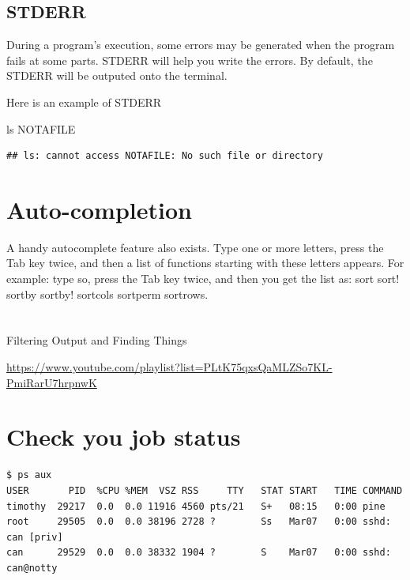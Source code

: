 \documentclass[]{book}
\makeatletter
\newenvironment{Shaded}{\begin{snugshade}}{\end{snugshade}}
\newcommand{\FunctionTok}[1]{\textcolor[rgb]{0.00,0.00,0.00}{#1}}
\newcommand{\NormalTok}[1]{#1}
\newenvironment{kframe}{%
\medskip{}
\setlength{\fboxsep}{.8em}
 \def\at@end@of@kframe{}%
 \ifinner\ifhmode%
  \def\at@end@of@kframe{\end{minipage}}%
  \begin{minipage}{\columnwidth}%
 \fi\fi%
 \def\FrameCommand##1{\hskip\@totalleftmargin \hskip-\fboxsep
 \colorbox{shadecolor}{##1}\hskip-\fboxsep
     \hskip-\linewidth \hskip-\@totalleftmargin \hskip\columnwidth}%
 \MakeFramed {\advance\hsize-\width
   \@totalleftmargin\z@ \linewidth\hsize
   \@setminipage}}%
 {\par\unskip\endMakeFramed%
 \at@end@of@kframe}
\renewenvironment{Shaded}{\begin{kframe}}{\end{kframe}}
\theoremstyle{definition}
\theoremstyle{definition}
\theoremstyle{definition}
\theoremstyle{remark}
\makeatother
\begin{document}
\subsection{STDERR}\label{stderr}

During a program's execution, some errors may be generated when the
program fails at some parts. STDERR will help you write the errors. By
default, the STDERR will be outputed onto the terminal.

Here is an example of STDERR

\begin{Shaded}
\begin{Highlighting}[]
\FunctionTok{ls}\NormalTok{ NOTAFILE}
\end{Highlighting}
\end{Shaded}

\begin{verbatim}
## ls: cannot access NOTAFILE: No such file or directory
\end{verbatim}

\section{Auto-completion}\label{auto-completion-1}

A handy autocomplete feature also exists. Type one or more letters,
press the Tab key twice, and then a list of functions starting with
these letters appears. For example: type so, press the Tab key twice,
and then you get the list as: sort sort! sortby sortby! sortcols
sortperm sortrows.

\section{}\label{section}

Filtering Output and Finding Things

\url{https://www.youtube.com/playlist?list=PLtK75qxsQaMLZSo7KL-PmiRarU7hrpnwK}

\section{Check you job status}\label{check-you-job-status}

\begin{verbatim}
$ ps aux  
USER       PID  %CPU %MEM  VSZ RSS     TTY   STAT START   TIME COMMAND
timothy  29217  0.0  0.0 11916 4560 pts/21   S+   08:15   0:00 pine  
root     29505  0.0  0.0 38196 2728 ?        Ss   Mar07   0:00 sshd: can [priv]   
can      29529  0.0  0.0 38332 1904 ?        S    Mar07   0:00 sshd: can@notty  
\end{verbatim}
\end{document}
